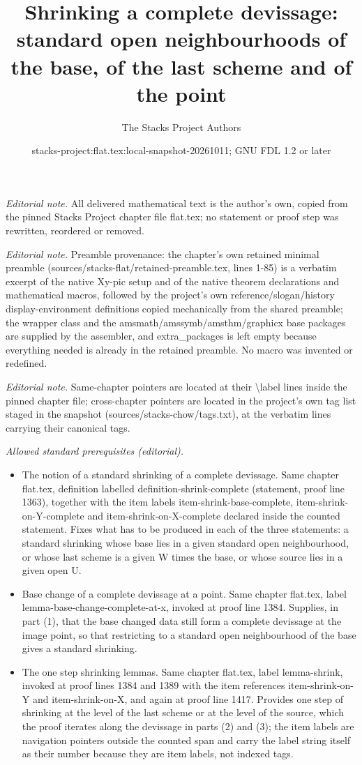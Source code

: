 \documentclass[10pt,a4paper]{amsart}
\title{Shrinking a complete devissage: standard open neighbourhoods of the base, of the last scheme and of the point}
\author{The Stacks Project Authors}
\date{stacks-project:flat.tex:local-snapshot-20261011; GNU FDL 1.2 or later}
\theoremstyle{plain}
\theoremstyle{definition}
\theoremstyle{remark}
\numberwithin{equation}{subsection}
\begin{document}
\maketitle
\noindent\textit{Editorial note.} All delivered mathematical text is the author's own, copied from the pinned Stacks Project chapter file flat.tex; no statement or proof step was rewritten, reordered or removed.\par\medskip
\noindent\textit{Editorial note.} Preamble provenance: the chapter's own retained minimal preamble (sources/stacks-flat/retained-preamble.tex, lines 1-85) is a verbatim excerpt of the native Xy-pic setup and of the native theorem declarations and mathematical macros, followed by the project's own reference/slogan/history display-environment definitions copied mechanically from the shared preamble; the wrapper class and the amsmath/amssymb/amsthm/graphicx base packages are supplied by the assembler, and extra\_packages is left empty because everything needed is already in the retained preamble. No macro was invented or redefined.\par\medskip
\noindent\textit{Editorial note.} Same-chapter pointers are located at their \textbackslash{}label lines inside the pinned chapter file; cross-chapter pointers are located in the project's own tag list staged in the snapshot (sources/stacks-chow/tags.txt), at the verbatim lines carrying their canonical tags.\par\medskip
\noindent\textit{Allowed standard prerequisites (editorial).}\begin{itemize}
\item The notion of a standard shrinking of a complete devissage. Same chapter flat.tex, definition labelled definition-shrink-complete (statement, proof line 1363), together with the item labels item-shrink-base-complete, item-shrink-on-Y-complete and item-shrink-on-X-complete declared inside the counted statement. Fixes what has to be produced in each of the three statements: a standard shrinking whose base lies in a given standard open neighbourhood, or whose last scheme is a given W times the base, or whose source lies in a given open U.
\item Base change of a complete devissage at a point. Same chapter flat.tex, label lemma-base-change-complete-at-x, invoked at proof line 1384. Supplies, in part (1), that the base changed data still form a complete devissage at the image point, so that restricting to a standard open neighbourhood of the base gives a standard shrinking.
\item The one step shrinking lemmas. Same chapter flat.tex, label lemma-shrink, invoked at proof lines 1384 and 1389 with the item references item-shrink-on-Y and item-shrink-on-X, and again at proof line 1417. Provides one step of shrinking at the level of the last scheme or at the level of the source, which the proof iterates along the devissage in parts (2) and (3); the item labels are navigation pointers outside the counted span and carry the label string itself as their number because they are item labels, not indexed tags.
\end{itemize}\medskip
\end{document}
